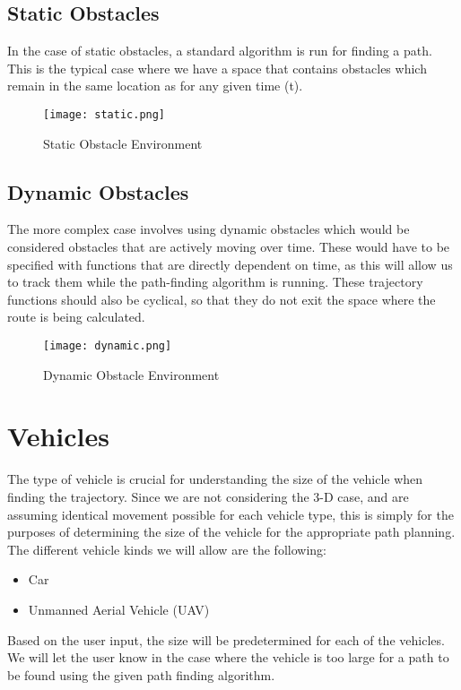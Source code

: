 \documentclass[10pt,twocolumn,letterpaper]{article}
\begin{document}
\subsection*{Static Obstacles}
In the case of static obstacles, a standard algorithm is run for finding a path. This is the typical case where we have a space that contains obstacles which remain in the same location as for any given time (t).

\begin{figure}[!hbt]
    \centering
    \texttt{[image: static.png]}    \caption{Static Obstacle Environment }
    \label{fig: static obs}
\end{figure}

\subsection*{Dynamic Obstacles}
The more complex case involves using dynamic obstacles which would be considered obstacles that are actively moving over time. These would have to be specified with functions that are directly dependent on time, as this will allow us to track them while the path-finding algorithm is running. These trajectory functions should also be cyclical, so that they do not exit the space where the route is being calculated. 

\begin{figure}[!hbt]
    \centering
    \texttt{[image: dynamic.png]}    \caption{Dynamic Obstacle Environment }
    \label{fig: dynamic obs}
\end{figure}

\section*{Vehicles}
The type of vehicle is crucial for understanding the size of the vehicle when finding the trajectory. Since we are not considering the 3-D case, and are assuming identical movement possible for each vehicle type, this is simply for the purposes of determining the size of the vehicle for the appropriate path planning. The different vehicle kinds we will allow are the following:
\begin{itemize}
    \item Car
    \item Unmanned Aerial Vehicle (UAV)
\end{itemize}
Based on the user input, the size will be predetermined for each of the vehicles. We will let the user know in the case where the vehicle is too large for a path to be found using the given path finding algorithm.
\end{document}

